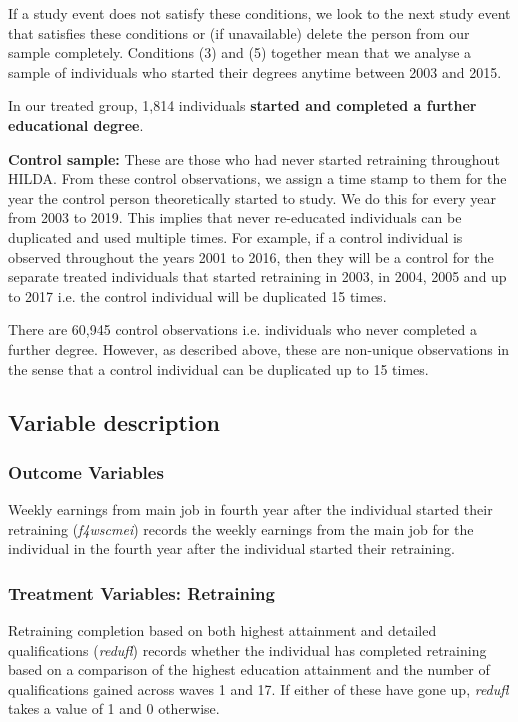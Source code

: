 \documentclass[12pt, a4paper]{article}
\begin{document}
If a study event does not satisfy these conditions, we look to the next study event that satisfies these conditions or (if unavailable) delete the person from our sample completely. Conditions (3) and (5) together mean that we analyse a sample of individuals who started their degrees anytime between 2003 and 2015.

In our treated group, 1,814 individuals \textbf{started and completed a further educational degree}. 

\textbf{Control sample:} These are those who had never started retraining throughout HILDA. From these control observations, we assign a time stamp to them for the year the control person theoretically started to study. We do this for every year from 2003 to 2019. This implies that never re-educated individuals can be duplicated and used multiple times. For example, if a control individual is observed throughout the years 2001 to 2016, then they will be a control for the separate treated individuals that started retraining in 2003, in 2004, 2005 and up to 2017 i.e. the control individual will be duplicated 15 times.

There are 60,945 control observations i.e. individuals who never completed a further degree. However, as described above, these are non-unique observations in the sense that a control individual can be duplicated up to 15 times. 

\subsection{Variable description}

\subsubsection{Outcome Variables}
Weekly earnings from main job in fourth year after the individual started their retraining (\textit{f4\textunderscore{}wscmei}) records the weekly earnings from the main job for the individual in the fourth year after the individual started their retraining. 

\subsubsection{Treatment Variables: Retraining}
Retraining completion based on both highest attainment and detailed qualifications (\textit{redufl}) records whether the individual has completed retraining based on a comparison of the highest education attainment and the number of qualifications gained across waves 1 and 17. If either of these have gone up, \textit{redufl} takes a value of 1 and 0 otherwise. 
\end{document}

